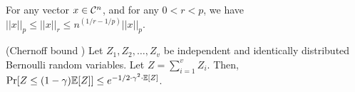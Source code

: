 \begin{fact}\label{fact:norms} For any vector $x\in \mathcal{C}^n$, and for any $0<r<p$, we have $||x||_p\leq ||x||_r\leq n^{(1/r-1/p)} ||x||_p$. \end{fact}

\begin{lem}(Chernoff bound \cite{MU2017})\label{lem:chernoff} Let $Z_1,Z_2,\ldots,Z_v$ be independent and identically distributed Bernoulli random variables. Let $Z=\sum_{i=1}^v Z_i$. Then, $\Pr[Z\leq(1-\gamma) \mathbb{E}[Z]]\leq e^{-1/2 \cdot \gamma^2 \cdot \mathbb{E}[Z]}$. \end{lem}

